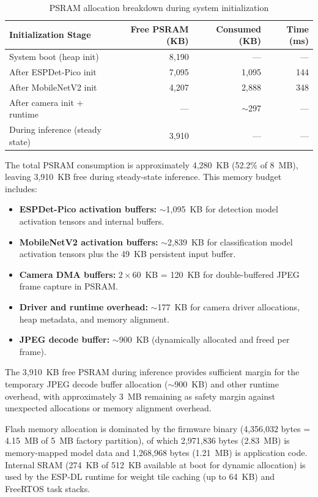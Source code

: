 \begin{table}[htbp]
\centering
\caption{PSRAM allocation breakdown during system initialization}
\label{tab:memory_footprint}
\begin{tabular}{lrrr}
\toprule
\textbf{Initialization Stage} & \textbf{Free PSRAM (KB)} & \textbf{Consumed (KB)} & \textbf{Time (ms)} \\
\midrule
System boot (heap init)            & 8,190  & ---      & ---  \\
After ESPDet-Pico init             & 7,095  & 1,095    & 144  \\
After MobileNetV2 init             & 4,207  & 2,888    & 348  \\
After camera init + runtime        & ---    & $\sim$297 & ---  \\
During inference (steady state)    & 3,910  & ---      & ---  \\
\bottomrule
\end{tabular}
\end{table}

The total PSRAM consumption is approximately 4,280~KB (52.2\% of 8~MB), leaving 3,910~KB free during steady-state inference. This memory budget includes:

\begin{itemize}
    \item \textbf{ESPDet-Pico activation buffers:} $\sim$1,095~KB for detection model activation tensors and internal buffers.
    \item \textbf{MobileNetV2 activation buffers:} $\sim$2,839~KB for classification model activation tensors plus the 49~KB persistent input buffer.
    \item \textbf{Camera DMA buffers:} $2 \times 60$~KB = 120~KB for double-buffered JPEG frame capture in PSRAM.
    \item \textbf{Driver and runtime overhead:} $\sim$177~KB for camera driver allocations, heap metadata, and memory alignment.
    \item \textbf{JPEG decode buffer:} $\sim$900~KB (dynamically allocated and freed per frame).
\end{itemize}

The 3,910~KB free PSRAM during inference provides sufficient margin for the temporary JPEG decode buffer allocation ($\sim$900~KB) and other runtime overhead, with approximately 3~MB remaining as safety margin against unexpected allocations or memory alignment overhead.

Flash memory allocation is dominated by the firmware binary (4,356,032 bytes = 4.15~MB of 5~MB factory partition), of which 2,971,836 bytes (2.83~MB) is memory-mapped model data and 1,268,968 bytes (1.21~MB) is application code. Internal SRAM (274~KB of 512~KB available at boot for dynamic allocation) is used by the ESP-DL runtime for weight tile caching (up to 64~KB) and FreeRTOS task stacks.

